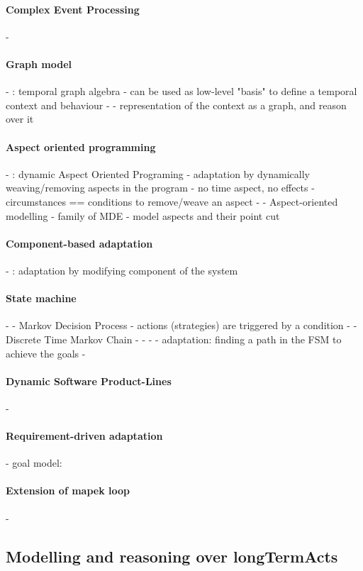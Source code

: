 \paragraph{Complex Event Processing}
- \cite{DBLP:conf/rr/AnicicFRSSS10}

\paragraph{Graph model}
- \cite{DBLP:conf/dbpl/MoffittS17}: temporal graph algebra
	- can be used as low-level "basis" to define a temporal context and behaviour
- \cite{DBLP:journals/tse/KramerM90}
	- representation of the context as a graph, and reason over it
	
\paragraph{Aspect oriented programming}
- \cite{DBLP:journals/taosd/GreenwoodB06, DBLP:conf/soco/DavidL06, DBLP:conf/icws/CharfiDM09, DBLP:journals/scp/ParraBCD11, DBLP:conf/ewsa/FalcarinA04, DBLP:conf/gpce/PintoFT03}: dynamic Aspect Oriented Programing
	- adaptation by dynamically weaving/removing aspects in the program
	- no time aspect, no effects
	- circumstances == conditions to remove/weave an aspect
- \cite{DBLP:conf/icse/MorinBNJ09}
	- Aspect-oriented modelling
	 - family of MDE
	- model aspects and their point cut

\paragraph{Component-based adaptation}
- \cite{DBLP:conf/soco/DavidL06}: adaptation by modifying component of the system

\paragraph{State machine}
- \cite{DBLP:conf/sigsoft/MorenoCGS15}
	- Markov Decision Process
	- actions (strategies) are triggered by a condition
- \cite{DBLP:conf/kbse/FilieriGLM11}
	- Discrete Time Markov Chain
- \cite{DBLP:conf/wetice/DjoudiBZ14}
- \cite{DBLP:conf/aosd/ZhangGC09}
- \cite{DBLP:conf/icse/GhezziPST13}
	- adaptation: finding a path in the FSM to achieve the goals
- \cite{DBLP:conf/kbse/TajalliGEM10}

\paragraph{Dynamic Software Product-Lines}
- \cite{DBLP:conf/dagstuhl/GhezziS10, DBLP:series/lncs/CordyCHLS13}

\paragraph{Requirement-driven adaptation}
- goal model: \cite{DBLP:conf/re/BaresiPS10}

\paragraph{Extension of \gls{mapek} loop}
- \cite{DBLP:conf/iscc/MaurerBEB11}

	


\subsection[Modelling and reasoning over long-term actions]{Modelling and reasoning over \glspl{longTermAct}}